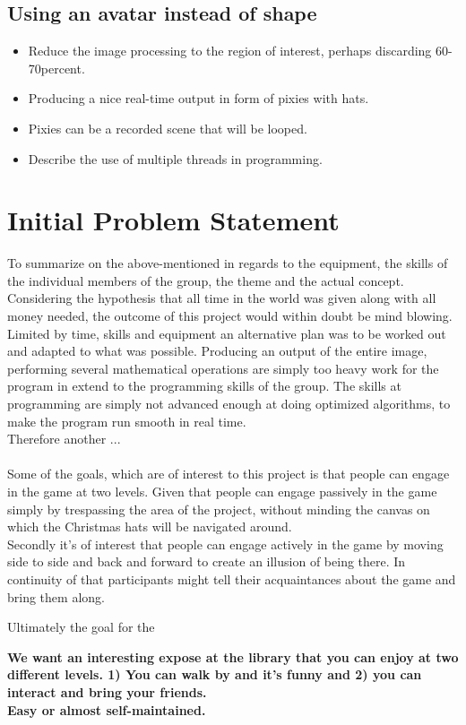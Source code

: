 \subsection{Using an avatar instead of shape}
 \begin{itemize}
\item Reduce the image processing to the region of interest, perhaps discarding 60-70percent.
\item Producing a nice real-time output in form of pixies with hats.
\item Pixies can be a recorded scene that will be looped.
\item Describe the use of multiple threads in programming.
\end{itemize}
 
\section{Initial Problem Statement}
To summarize on the above-mentioned in regards to the equipment, the skills of the individual members of the group, the theme and the actual concept.\\
Considering the hypothesis that all time in the world was given along with all money needed, the outcome of this project would within doubt be mind blowing. Limited by time, skills and equipment an alternative plan was to be worked out and adapted to what was possible. Producing an output of the entire image, performing several mathematical operations are simply too heavy work for the program in extend to the programming skills of the group. The skills at programming are simply not advanced enough at doing optimized algorithms, to make the program run smooth in real time. \\
Therefore another ...\\
\\
Some of the goals, which are of interest to this project is that people can engage in the game at two levels. Given that people can engage passively in the game simply by trespassing the area of the project, without minding the canvas on which the Christmas hats will be navigated around.\\
Secondly it's of interest that people can engage actively in the game by moving side to side and back and forward to create an illusion of being there. In continuity of that participants might tell their acquaintances about the game and bring them along.

Ultimately the goal for the  

      
\textbf{We want an interesting expose at the library that you can enjoy at two different levels. 1) You can walk by and it's funny and 2) you can interact and bring your friends.}\\
\textbf{Easy or almost self-maintained.}











